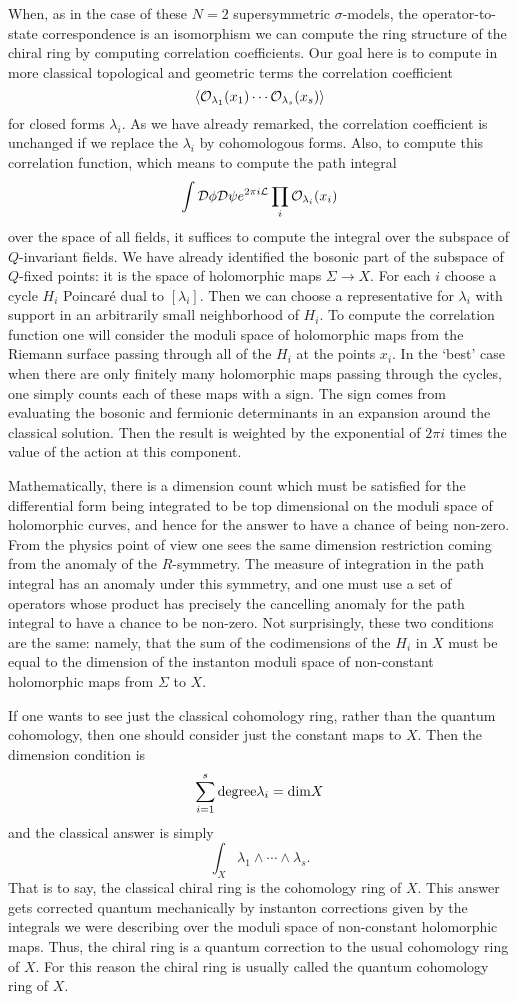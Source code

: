 When, as in the case of these $N=2$ supersymmetric $\sigma$-models,
the operator-to-state
correspondence is an isomorphism we can compute the ring structure of
the chiral ring by computing correlation coefficients.
Our goal here is to compute in more classical topological and
geometric terms the correlation coefficient
$$\langle{\cal O}_{\lambda_1}(x_1)\cdots{\cal
O}_{\lambda_s}(x_s)\rangle$$
for closed forms $\lambda_i$.
As we have already remarked, the correlation coefficient is unchanged
if we replace the $\lambda_i$ by cohomologous forms. Also, to compute
this correlation function,
which means to compute the path integral
$$\int{\cal D}\phi{\cal D}\psi e^{2\pi i{\cal L}}\prod_i{\cal
O}_{\lambda_i}(x_i)$$
over the space of all fields, it suffices to compute the integral over
the subspace of $Q$-invariant fields.
We have already identified
 the bosonic part of the subspace
of $Q$-fixed points: it is the space of
holomorphic maps $\Sigma\to X$.
For each $i$ choose a cycle $H_i$ Poincar\'e dual to $[\lambda_i]$.
Then we can choose a representative for $\lambda_i$ with support in an
arbitrarily small neighborhood of $H_i$.
To compute the correlation function one will consider the
moduli space of holomorphic maps from the Riemann surface passing
through all of the $H_i$ at the points $x_i$. In the `best' case  when
there are only finitely many holomorphic maps passing through the
cycles, one simply counts each of these maps with a sign.  The sign
comes from evaluating the bosonic and fermionic determinants in an
expansion around the classical solution.
Then the result is weighted by the exponential of $2\pi i$ times the
value of the action at this component.

Mathematically, there is a dimension count which must be satisfied for
the differential form being integrated to be top dimensional on the
moduli space of holomorphic curves, and hence for the answer to have a
chance of being non-zero. From the physics point of view one
sees the same dimension restriction  coming from the anomaly of the
$R$-symmetry. The measure of integration in the path integral has an
anomaly under this symmetry, and one
must use a set of operators whose product has precisely the cancelling
anomaly for the path integral to have a chance to be non-zero. Not
surprisingly, these two conditions are the same: namely, that the sum of
the codimensions of the $H_i$ in $X$ must be equal to the dimension of
the instanton moduli space of non-constant holomorphic maps from
$\Sigma$ to $X$.

If one wants to see just the classical cohomology ring, rather
than the quantum cohomology, then one should consider just the constant
maps to $X$.  Then the dimension condition is
$$\sum_{i=1}^s{\rm degree}\lambda_i={\rm dim}X$$
and the classical answer is simply
$$\int_X\lambda_1\wedge\cdots\wedge \lambda_s.$$
That is to say, the classical chiral ring is the cohomology ring of
$X$.
This answer gets corrected quantum mechanically by instanton
corrections  given by the integrals we were describing over the moduli
space of non-constant holomorphic maps. Thus, the chiral ring is a quantum
correction to the usual cohomology ring of $X$. For this reason the
chiral ring is usually  called the quantum cohomology ring of $X$.



